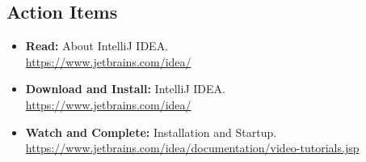 \documentclass[letterpaper,11pt]{article}
\begin{document}
\subsection*{Action Items}

\begin{itemize}
\item \textbf{Read:} About IntelliJ IDEA. \\
\url{https://www.jetbrains.com/idea/}
\item \textbf{Download and Install:} IntelliJ IDEA. \\
\url{https://www.jetbrains.com/idea/}
\item \textbf{Watch and Complete:} Installation and Startup. \\
\url{https://www.jetbrains.com/idea/documentation/video-tutorials.jsp}
\end{itemize}
\end{document}
